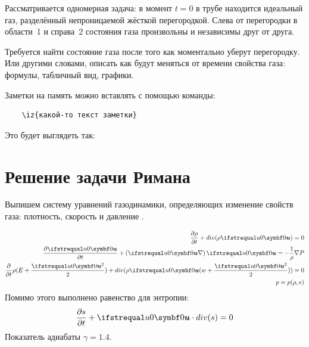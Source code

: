\documentclass[a4paper,12pt]{extarticle}
\begin{document}
Рассматривается одномерная задача: 
в момент $t=0$ в трубе находится идеальный газ, разделённый  непроницаемой жёсткой перегородкой. 
Слева от перегородки в области~1 и  справа~2 состояния газа произвольны и независимы друг от друга. 


Требуется найти состояние газа после того как моментально уберут перегородку. 
Или другими словами, описать как будут меняться от времени свойства газа: формулы, табличный вид, графики. 

Заметки на память можно вставлять с помощью команды:
\begin{verbatim}
	\iz{какой-то текст заметки}
\end{verbatim}
 
Это будет выглядеть так: 	

\section{Решение задачи Римана}

Выпишем систему уравнений газодинамики, определяющих изменение свойств газа: плотность, скорость и давление \cite{zr1968}.

\begin{align} 
	\frac{\partial \rho}{\partial t} + div(\rho \vecxu) = 0 \label{eq:continuity}\\
	\frac{\partial  \vecxu}{\partial t} + \left(\vecxu \nabla \right)\vecxu = -\frac{1}{\rho}\nabla P  \label{eq:euler}	\\
	\frac{\partial }{\partial t}\rho(E+\frac{\vecxu^2}{2}) + div(\rho \vecxu (w+\frac{\vecxu^2}{2})) = 0  \label{eq:energy} \\
        p = p(\rho,e)
\end{align}
Помимо этого выполнено равенство для энтропии:
    $$ \frac{\partial s}{\partial t} + \vecxu \cdot div(s) = 0 \label{eq:entropy} $$
Показатель адиабаты $\gamma = 1.4$. \\
\end{document}
